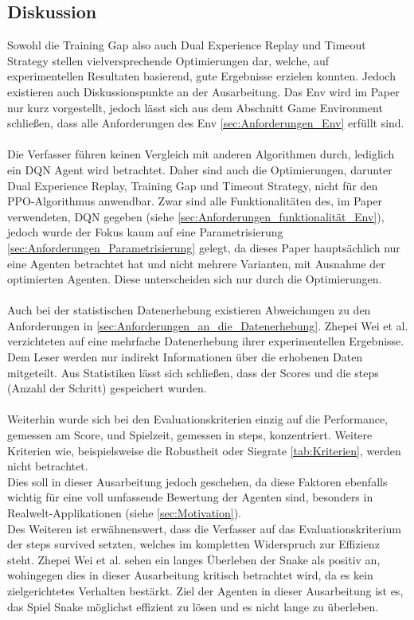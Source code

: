 \subsection{Diskussion} \label{sec:Paper_1_Diskussion}
Sowohl die Training Gap also auch Dual Experience Replay und Timeout Strategy stellen vielversprechende Optimierungen dar, welche, auf experimentellen Resultaten basierend, gute Ergebnisse erzielen konnten. Jedoch existieren auch Diskussionspunkte an der Ausarbeitung.
Das Env wird im Paper nur kurz vorgestellt, jedoch lässt sich aus dem Abschnitt Game Environment schließen, dass alle Anforderungen des Env \ref{sec:Anforderungen_Env} erfüllt sind.\\
\\Die Verfasser führen keinen Vergleich mit anderen Algorithmen durch, lediglich ein DQN Agent wird betrachtet. 
Daher sind auch die Optimierungen, darunter Dual Experience Replay, Training Gap und Timeout Strategy, nicht für den PPO-Algorithmus anwendbar. 
Zwar sind alle Funktionalitäten des, im Paper verwendeten, DQN gegeben 
(siehe \ref{sec:Anforderungen_funktionalität_Env}), jedoch wurde der Fokus kaum auf eine Parametrisierung \ref{sec:Anforderungen_Parametrisierung} gelegt, da dieses Paper hauptsächlich nur eine Agenten betrachtet hat und nicht mehrere Varianten, mit Ausnahme der optimierten Agenten. Diese unterscheiden sich nur durch die Optimierungen.\\
\\Auch bei der statistischen Datenerhebung existieren Abweichungen zu den Anforderungen in \ref{sec:Anforderungen_an_die_Datenerhebung}. Zhepei Wei et al. verzichteten auf eine mehrfache Datenerhebung ihrer experimentellen Ergebnisse. Dem Leser werden nur indirekt Informationen über die erhobenen Daten mitgeteilt. Aus Statistiken lässt sich schließen, dass der Scores und die steps (Anzahl der Schritt) gespeichert wurden.\\
\\Weiterhin wurde sich bei den Evaluationskriterien einzig auf die Performance, gemessen am Score, und Spielzeit, gemessen in steps, konzentriert. Weitere Kriterien wie, beispielsweise die Robustheit oder Siegrate \ref{tab:Kriterien}, werden nicht betrachtet.\\
Dies soll in dieser Ausarbeitung jedoch geschehen, da diese Faktoren ebenfalls wichtig für eine voll umfassende Bewertung der Agenten sind, besonders in Realwelt-Applikationen (siehe \ref{sec:Motivation}).\\ 
Des Weiteren ist erwähnenswert, dass die Verfasser auf das Evaluationskriterium der steps survived setzten, welches im kompletten Widerspruch zur Effizienz steht. Zhepei Wei et al. sehen ein langes Überleben der Snake als positiv an, wohingegen dies in dieser Ausarbeitung kritisch betrachtet wird, da es kein zielgerichtetes Verhalten bestärkt. Ziel der Agenten in dieser Ausarbeitung ist es, das Spiel Snake möglichst effizient zu lösen und es nicht lange zu überleben.

